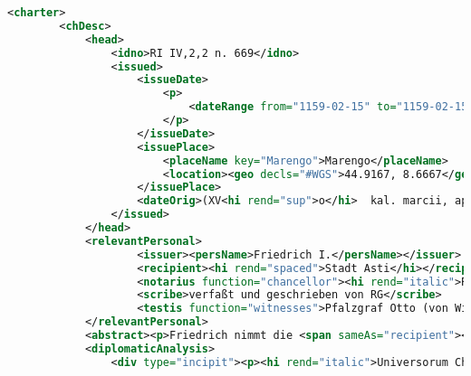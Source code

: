 \begin{lstlisting}[language=XML]
	<charter>
		<chDesc>
			<head>
				<idno>RI IV,2,2 n. 669</idno>
				<issued>
					<issueDate>
						<p>
							<dateRange from="1159-02-15" to="1159-02-15">1159 Februar 15</dateRange>
						</p>
					</issueDate>
					<issuePlace>
						<placeName key="Marengo">Marengo</placeName>
						<location><geo decls="#WGS">44.9167, 8.6667</geo></location>
					</issuePlace>
					<dateOrig>(XV<hi rend="sup">o</hi>  kal. marcii, aput Marengam)</dateOrig>
				</issued>
			</head>
			<relevantPersonal>
					<issuer><persName>Friedrich I.</persName></issuer>
					<recipient><hi rend="spaced">Stadt Asti</hi></recipient>
					<notarius function="chancellor"><hi rend="italic">Reinaldus sacri palacii imperialis canz.</hi></notarius>
					<scribe>verfaßt und geschrieben von RG</scribe>
					<testis function="witnesses">Pfalzgraf Otto (von Wittelsbach), Graf Rudolf von Pfullendorf, Markgraf Obizo Malaspina, Bischof Eberhard von Bamberg und Pfalzgraf Konrad bei Rhein</testis>
			</relevantPersonal>
			<abstract><p>Friedrich nimmt die <span sameAs="recipient"><hi rend="spaced">Stadt Asti</hi> </span>  unter die Herrschaft des Reiches, verleiht den von ihm dort nach freiem Ermessen eingesetzten Rektoren Carioth, Robaldus Gardinus und Petrus Cortessius die namentlich angeführten Regalien (<hi rend="italic">Hec itaque regalia esse dicuntur: moneta, vie publice, aquatica, flumina publica, molandina, furni, forestica, mensure, bancatica, ripatica, portus, argentarie, pedagia, piscationis redditus, sestaria vini et frumenti et eorum, que venduntur ad mensuram, placita, batalia, rubi, restituciones in integrum minorum et alia omnia, que ad regalia iura pertinent</hi>.) in der Stadt, dem Bistum und der Grafschaft mit den genannten Orten vorbehaltlich des königlichen Fodrums gegen einen jährlich an St. Martin (11. November) zu entrichtenden Zins von 150 Mark Silber sowie die Reichsburg Annone mit allen Zugehörungen gegen einen Jahreszins von 50 Mark Silber und sagt zu, die genannten Verleihungen künftig nur den nach seinem Willen aus der Stadt zu erwählenden Amtsträgern zu gewähren. <span n="witnesses">Z.: Pfalzgraf Otto (von Wittelsbach), Graf Rudolf von Pfullendorf, Markgraf Obizo Malaspina, Bischof Eberhard von Bamberg und Pfalzgraf Konrad bei Rhein</span>. - <span n="chancellor"><hi rend="italic">Reinaldus sacri palacii imperialis canz.</hi> </span>; <span n="clerk">verfaßt und geschrieben von RG</span>. <span n="incipit"><hi rend="italic">Universorum Christi et imperii</hi> </span>.</p></abstract>
			<diplomaticAnalysis>
				<div type="incipit"><p><hi rend="italic">Universorum Christi et imperii</hi></p></div>

\end{lstlisting}
